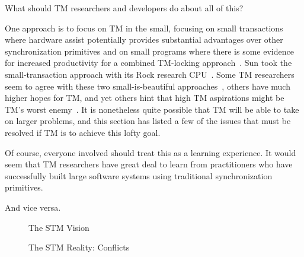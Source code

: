 What should TM researchers and developers do about all of this?

One approach is to focus on TM in the small, focusing on small
transactions where hardware assist potentially provides substantial
advantages over other synchronization primitives and on small programs
where there is some evidence for increased productivity for a combined
TM-locking approach~\cite{VPankratius2011TMvsLockingProductivity}.
Sun took the small-transaction approach with its Rock research
CPU~\cite{DaveDice2009ASPLOSRockHTM}.
Some TM researchers seem to agree with these two small-is-beautiful
approaches~\cite{JMStone93}, others have much higher hopes for TM, and yet others
hint that high TM aspirations might be TM's worst
enemy~\cite[Section 6]{Attiya:2010:ICT:1835698.1835699}.
It is nonetheless quite possible that TM will be able to take on larger
problems, and this section has listed a few of the issues that must be
resolved if TM is to achieve this lofty goal.

Of course, everyone involved should treat this as a learning experience.
It would seem that TM researchers have great deal to learn from
practitioners who have successfully built large software systems using
traditional synchronization primitives.

And vice versa.

\QuickQuizEnd

\begin{figure}
\centering
{}
\caption{The STM Vision}
\end{figure}

\begin{figure}
\centering
{}
\caption{The STM Reality:
			  Conflicts}
\end{figure}

